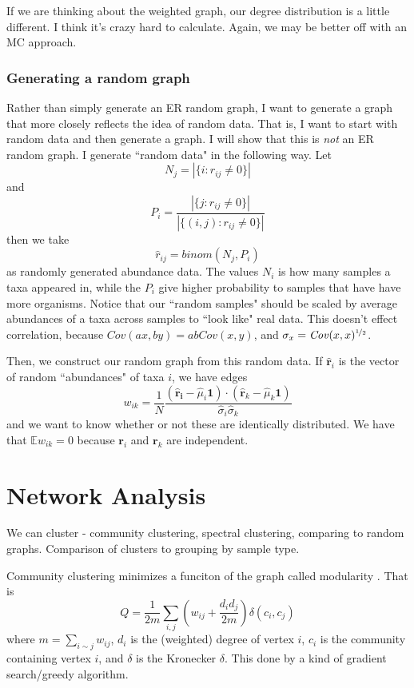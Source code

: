 \documentclass[10pt]{article}
\theoremstyle{definition}
\numberwithin{theorem}{section}
\numberwithin{definition}{section}
\numberwithin{lemma}{section}
\numberwithin{corollary}{section}
\numberwithin{clm}{section}
\numberwithin{rmk}{section}
\newcommand{\nhalf}{\nicefrac{1}{2}}
\renewcommand{\b}{\bm}
\newcommand{\bE}{\mathbb{E}}
\begin{document}
If we are thinking about the weighted graph, our degree distribution is a little different. I think it's crazy hard to calculate. Again, we may be better off with an MC approach.

\subsubsection{Generating a random graph}
Rather than simply generate an ER random graph, I want to generate a graph that more closely reflects the idea of random data. That is, I want to start with random data and then generate a graph. I will show that this is \emph{not} an ER random graph. I generate ``random data" in the following way. Let 
\[
N_j = |\{i: r_{ij} \neq 0\}|
\]
and 
\[
P_i = \frac{|\{j: r_{ij}\neq 0 \}|}{|\{(i,j): r_{ij}\neq 0 \}|}
\]
then we take 
\[
\hat{r}_{ij} = \mathit{binom}(N_j,P_i)
\]
as randomly generated abundance data. The values $N_i$ is how many samples a taxa appeared in, while the $P_i$ give higher probability to samples that have have more organisms. Notice that our ``random samples" should be scaled by average abundances of a taxa across samples to ``look like" real data. This doesn't effect correlation, because $\mathit{Cov}(ax,by) = ab\mathit{Cov}(x,y)$, and $\sigma_x = \mathit{Cov}(x,x)^{\nhalf}$.

Then, we construct our random graph from this random data. If $\hat{\b{r}}_i$ is the vector of random ``abundances" of taxa $i$, we have edges
\[
w_{ik} = \frac{1}{N}\frac{(\b{\hat{\b{r}}_i}- \hat{\mu}_i\b{1}) \cdot (\hat{\b{r}}_k - \hat{\mu}_k\b{1})}{\hat{\sigma}_i \hat{\sigma}_k}
\]
and we want to know whether or not these are identically distributed. We have that $\bE w_{ik} = 0$ because $\b{r}_i$ and $\b{r}_k$ are independent. 

\section{Network Analysis}
We can cluster - community clustering, spectral clustering, comparing to random graphs. Comparison of clusters to grouping by sample type.

Community clustering minimizes a funciton of the graph called modularity \cite{PhysRevE.70.066111}\cite{PhysRevE.70.056131}. That is 
\[
Q = \frac{1}{2m}\sum_{i,j}\left(w_{ij} + \frac{d_id_j}{2m}\right) \delta(c_i,c_j)
\]
where $m = \sum_{i\sim j} w_{ij}$, $d_i$ is the (weighted) degree of vertex $i$, $c_i$ is the community containing vertex $i$, and $\delta$ is the Kronecker $\delta$. This done by a kind of gradient search/greedy algorithm.
\end{document}
